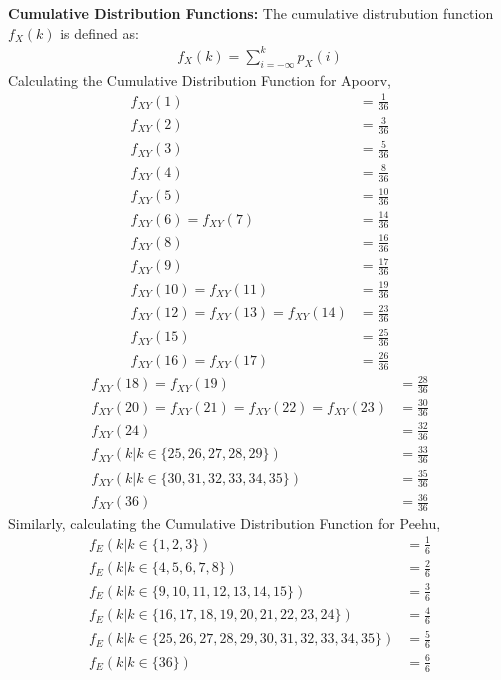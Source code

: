 \documentclass[journal,12pt,twocolumn]{IEEEtran}
\theoremstyle{remark}
\begin{document}
\textbf{Cumulative Distribution Functions:} The cumulative distrubution function $f_X(k)$ is defined as:
\begin{align}
f_X(k) = \sum_{i=-\infty}^{k} p_X(i)
\end{align}
Calculating the Cumulative Distribution Function for Apoorv,
\begin{align}
f_{XY}(1) &= \frac{1}{36}\\
f_{XY}(2) &= \frac{3}{36}\\
f_{XY}(3) &= \frac{5}{36}\\
f_{XY}(4) &= \frac{8}{36}\\
f_{XY}(5) &= \frac{10}{36}\\
f_{XY}(6) = f_{XY}(7) &= \frac{14}{36}\\
f_{XY}(8) &= \frac{16}{36}\\
f_{XY}(9) &= \frac{17}{36}\\
f_{XY}(10) = f_{XY}(11) &= \frac{19}{36}\\
f_{XY}(12) = f_{XY}(13) = f_{XY}(14) &= \frac{23}{36}\\
f_{XY}(15) &= \frac{25}{36}\\
f_{XY}(16) = f_{XY}(17) &= \frac{26}{36}
\end{align}
\begin{align}
f_{XY}(18) = f_{XY}(19) &= \frac{28}{36}\\
f_{XY}(20) = f_{XY}(21) = f_{XY}(22) = f_{XY}(23) &= \frac{30}{36}\\
f_{XY}(24) &= \frac{32}{36}\\
f_{XY}(k | k \in \{25, 26, 27, 28, 29\}) &= \frac{33}{36}\\
f_{XY}(k | k \in \{30, 31, 32, 33, 34, 35\}) &= \frac{35}{36}\\
f_{XY}(36) &= \frac{36}{36}
\end{align}
Similarly, calculating the Cumulative Distribution Function for Peehu,
\begin{align}
f_{E}(k | k \in \{1, 2, 3\}) &= \frac{1}{6}\\
f_{E}(k | k \in \{4, 5, 6, 7, 8\}) &= \frac{2}{6}\\
f_{E}(k | k \in \{9, 10, 11, 12, 13, 14, 15\}) &= \frac{3}{6}\\
f_{E}(k | k \in \{16, 17, 18, 19, 20, 21, 22, 23, 24\}) &= \frac{4}{6}\\
f_{E}(k | k \in \{25, 26, 27, 28, 29, 30, 31, 32, 33, 34, 35\}) &= \frac{5}{6}\\
f_{E}(k | k \in \{36\}) &= \frac{6}{6}
\end{align}
\end{document}
